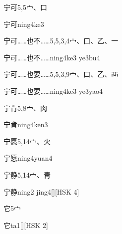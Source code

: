 \begin{entry}{宁可}{5,5}{⼧、⼝}
  \begin{phonetics}{宁可}{ning4ke3}
  \end{phonetics}
\end{entry}

\begin{entry}{宁可……也不……}{5,5,3,4}{⼧、⼝、⼄、⼀}
  \begin{phonetics}{宁可……也不……}{ning4ke3 ye3bu4}
  \end{phonetics}
\end{entry}

\begin{entry}{宁可……也要……}{5,5,3,9}{⼧、⼝、⼄、⾑}
  \begin{phonetics}{宁可……也要……}{ning4ke3 ye3yao4}
  \end{phonetics}
\end{entry}

\begin{entry}{宁肯}{5,8}{⼧、⾁}
  \begin{phonetics}{宁肯}{ning4ken3}
  \end{phonetics}
\end{entry}

\begin{entry}{宁愿}{5,14}{⼧、⽕}
  \begin{phonetics}{宁愿}{ning4yuan4}
  \end{phonetics}
\end{entry}

\begin{entry}{宁静}{5,14}{⼧、⾭}
  \begin{phonetics}{宁静}{ning2 jing4}[][HSK 4]
  \end{phonetics}
\end{entry}

\begin{entry}{它}{5}{⼧}
  \begin{phonetics}{它}{ta1}[][HSK 2]
  \end{phonetics}
\end{entry}

